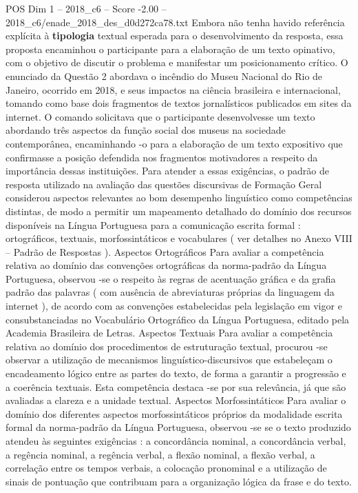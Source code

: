 \begin{textsample}{POS Dim 1 – 2018\_c6 – Score -2.00 – 2018\_c6/enade\_2018\_des\_d0d272ca78.txt}
Embora não tenha havido referência explícita à \textbf{tipologia} textual esperada para o desenvolvimento da resposta, essa proposta encaminhou o participante para a elaboração de um texto opinativo, com o objetivo de discutir o problema e manifestar um posicionamento crítico.
O enunciado da Questão 2 abordava o incêndio do Museu Nacional do Rio de Janeiro, ocorrido em 2018, e seus impactos na ciência brasileira e internacional, tomando como base dois fragmentos de textos jornalísticos publicados em sites da internet.
O comando solicitava que o participante desenvolvesse um texto abordando três aspectos da função social dos museus na sociedade contemporânea, encaminhando -o para a elaboração de um texto expositivo que confirmasse a posição defendida nos fragmentos motivadores a respeito da importância dessas instituições.
Para atender a essas exigências, o padrão de resposta utilizado na avaliação das questões discursivas de Formação Geral considerou aspectos relevantes ao bom desempenho linguístico como competências distintas, de modo a permitir um mapeamento detalhado do domínio dos recursos disponíveis na Língua Portuguesa para a comunicação escrita formal : ortográficos, textuais, morfossintáticos e vocabulares ( ver detalhes no Anexo VIII – Padrão de Respostas ).
Aspectos Ortográficos Para avaliar a competência relativa ao domínio das convenções ortográficas da norma-padrão da Língua Portuguesa, observou -se o respeito às regras de acentuação gráfica e da grafia padrão das palavras ( com ausência de abreviaturas próprias da linguagem da internet ), de acordo com as convenções estabelecidas pela legislação em vigor e consubstanciadas no Vocabulário Ortográfico da Língua Portuguesa, editado pela Academia Brasileira de Letras.
Aspectos Textuais Para avaliar a competência relativa ao domínio dos procedimentos de estruturação textual, procurou -se observar a utilização de mecanismos linguístico-discursivos que estabeleçam o encadeamento lógico entre as partes do texto, de forma a garantir a progressão e a coerência textuais.
Esta competência destaca -se por sua relevância, já que são avaliadas a clareza e a unidade textual.
Aspectos Morfossintáticos Para avaliar o domínio dos diferentes aspectos morfossintáticos próprios da modalidade escrita formal da norma-padrão da Língua Portuguesa, observou -se se o texto produzido atendeu às seguintes exigências : a concordância nominal, a concordância verbal, a regência nominal, a regência verbal, a flexão nominal, a flexão verbal, a correlação entre os tempos verbais, a colocação pronominal e a utilização de sinais de pontuação que contribuam para a organização lógica da frase e do texto.

\end{textsample}
